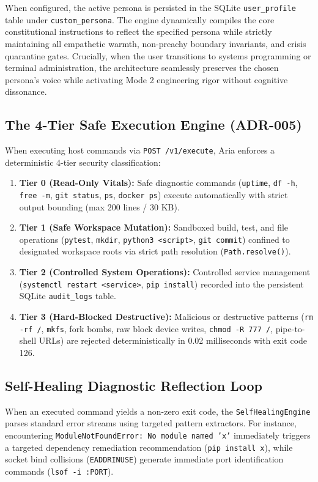 \documentclass[10pt,a4paper]{article}
\begin{document}
When configured, the active persona is persisted in the SQLite \texttt{user\_profile} table under \texttt{custom\_persona}. The engine dynamically compiles the core constitutional instructions to reflect the specified persona while strictly maintaining all empathetic warmth, non-preachy boundary invariants, and crisis quarantine gates. Crucially, when the user transitions to systems programming or terminal administration, the architecture seamlessly preserves the chosen persona's voice while activating Mode 2 engineering rigor without cognitive dissonance.

\subsection{The 4-Tier Safe Execution Engine (ADR-005)}
When executing host commands via \texttt{POST /v1/execute}, Aria enforces a deterministic 4-tier security classification:
\begin{enumerate}
    \item \textbf{Tier 0 (Read-Only Vitals):} Safe diagnostic commands (\texttt{uptime}, \texttt{df -h}, \texttt{free -m}, \texttt{git status}, \texttt{ps}, \texttt{docker ps}) execute automatically with strict output bounding (max 200 lines / 30 KB).
    \item \textbf{Tier 1 (Safe Workspace Mutation):} Sandboxed build, test, and file operations (\texttt{pytest}, \texttt{mkdir}, \texttt{python3 <script>}, \texttt{git commit}) confined to designated workspace roots via strict path resolution (\texttt{Path.resolve()}).
    \item \textbf{Tier 2 (Controlled System Operations):} Controlled service management (\texttt{systemctl restart <service>}, \texttt{pip install}) recorded into the persistent SQLite \texttt{audit\_logs} table.
    \item \textbf{Tier 3 (Hard-Blocked Destructive):} Malicious or destructive patterns (\texttt{rm -rf /}, \texttt{mkfs}, fork bombs, raw block device writes, \texttt{chmod -R 777 /}, pipe-to-shell URLs) are rejected deterministically in 0.02 milliseconds with exit code 126.
\end{enumerate}

\subsection{Self-Healing Diagnostic Reflection Loop}
When an executed command yields a non-zero exit code, the \texttt{SelfHealingEngine} parses standard error streams using targeted pattern extractors. For instance, encountering \texttt{ModuleNotFoundError: No module named 'x'} immediately triggers a targeted dependency remediation recommendation (\texttt{pip install x}), while socket bind collisions (\texttt{EADDRINUSE}) generate immediate port identification commands (\texttt{lsof -i :PORT}).
\end{document}
